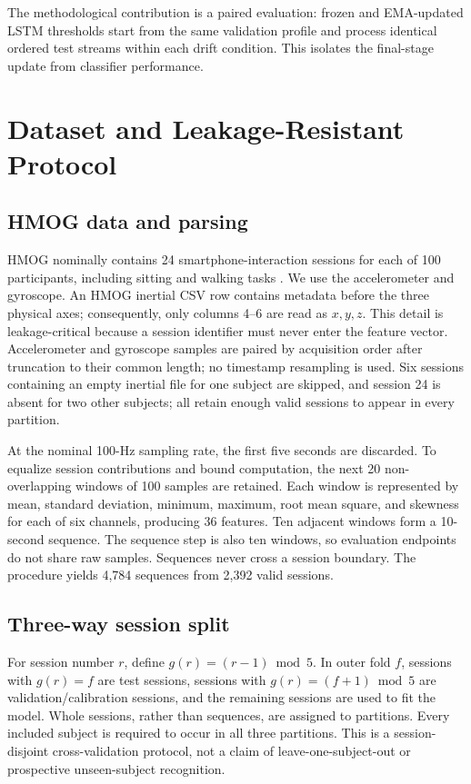 \documentclass[3p,times,procedia]{elsarticle}
\begin{document}
The methodological contribution is a paired evaluation: frozen and EMA-updated
LSTM thresholds start from the same validation profile and process identical
ordered test streams within each drift condition. This isolates the final-stage
update from classifier performance.

\section{Dataset and Leakage-Resistant Protocol}
\label{sec:data}

\subsection{HMOG data and parsing}

HMOG nominally contains 24 smartphone-interaction sessions for each of 100 participants,
including sitting and walking tasks \cite{sitova_hmog_2016}. We use the
accelerometer and gyroscope. An HMOG inertial CSV row contains metadata before
the three physical axes; consequently, only columns 4--6 are read as $x,y,z$.
This detail is leakage-critical because a session identifier must never enter
the feature vector. Accelerometer and gyroscope samples are paired by acquisition
order after truncation to their common length; no timestamp resampling is used.
Six sessions containing an empty inertial file for one subject are skipped, and
session 24 is absent for two other subjects; all retain enough valid sessions to
appear in every partition.

At the nominal 100-Hz sampling rate, the first five seconds are discarded. To
equalize session contributions and bound computation, the next 20 non-overlapping
windows of 100 samples are retained. Each window is represented by mean,
standard deviation, minimum, maximum, root mean square, and skewness for each of
six channels, producing 36 features. Ten adjacent windows form a 10-second
sequence. The sequence step is also ten windows, so evaluation endpoints do not
share raw samples. Sequences never cross a session boundary. The procedure yields
4,784 sequences from 2,392 valid sessions.

\subsection{Three-way session split}

For session number $r$, define $g(r)=(r-1)\bmod 5$. In outer fold $f$, sessions
with $g(r)=f$ are test sessions, sessions with
$g(r)=(f+1)\bmod 5$ are validation/calibration sessions, and the remaining
sessions are used to fit the model. Whole sessions, rather than sequences, are
assigned to partitions. Every included subject is required to occur in all
three partitions. This is a session-disjoint cross-validation protocol, not a
claim of leave-one-subject-out or prospective unseen-subject recognition.
\end{document}
